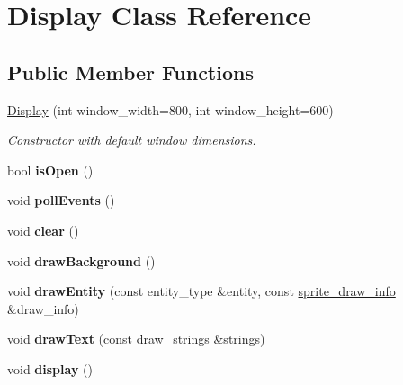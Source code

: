 \hypertarget{class_display}{\section{Display Class Reference}
\label{class_display}
}
\subsection*{Public Member Functions}
\begin{DoxyCompactItemize}
\item 
\hypertarget{class_display_a305a7d8fc20a838a73d5706820935136}{\hyperlink{class_display_a305a7d8fc20a838a73d5706820935136}{Display} (int window\+\_\+width=800, int window\+\_\+height=600)}\label{class_display_a305a7d8fc20a838a73d5706820935136}

\begin{DoxyCompactList}\small\item\em Constructor with default window dimensions. \end{DoxyCompactList}\item 
\hypertarget{class_display_abfcf2f222f42edcfa2c9b3949817ec84}{bool {\bfseries is\+Open} ()}\label{class_display_abfcf2f222f42edcfa2c9b3949817ec84}

\item 
\hypertarget{class_display_aa56b082e14b61988f2d0d01617e0c27d}{void {\bfseries poll\+Events} ()}\label{class_display_aa56b082e14b61988f2d0d01617e0c27d}

\item 
\hypertarget{class_display_a14242933dd00fc1d50f9ae70d5121d14}{void {\bfseries clear} ()}\label{class_display_a14242933dd00fc1d50f9ae70d5121d14}

\item 
\hypertarget{class_display_a2db7dc6b0ffa4851cf49f3d37095d185}{void {\bfseries draw\+Background} ()}\label{class_display_a2db7dc6b0ffa4851cf49f3d37095d185}

\item 
\hypertarget{class_display_a8eff4790fce1c95ad443b224c313488a}{void {\bfseries draw\+Entity} (const entity\+\_\+type \&entity, const \hyperlink{structsprite__draw__info}{sprite\+\_\+draw\+\_\+info} \&draw\+\_\+info)}\label{class_display_a8eff4790fce1c95ad443b224c313488a}

\item 
\hypertarget{class_display_a37aef4a33faf48a6f0c777290f5334ce}{void {\bfseries draw\+Text} (const \hyperlink{structdraw__strings}{draw\+\_\+strings} \&strings)}\label{class_display_a37aef4a33faf48a6f0c777290f5334ce}

\item 
\hypertarget{class_display_aa3ab70ec7b76fa3ed139d19e53e72283}{void {\bfseries display} ()}\label{class_display_aa3ab70ec7b76fa3ed139d19e53e72283}

\end{DoxyCompactItemize}


